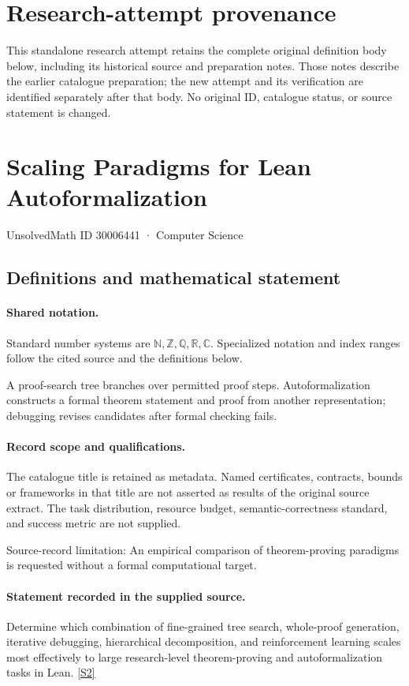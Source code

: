 \documentclass[11pt]{article}
\begin{document}
\section*{Research-attempt provenance}
This standalone research attempt retains the complete original definition body below,
including its historical source and preparation notes. Those notes describe the
earlier catalogue preparation; the new attempt and its verification are identified
separately after that body. No original ID, catalogue status, or source statement is changed.

\section{Scaling Paradigms for Lean Autoformalization}\label{30006441}
{\small UnsolvedMath ID 30006441 · Computer Science}
\subsection{Definitions and mathematical statement}

\paragraph{Shared notation.}Standard number systems are $\mathbb N,\mathbb Z,\mathbb Q,\mathbb R,\mathbb C$. Specialized notation and index ranges follow the cited source and the definitions below.


A proof-search tree branches over permitted proof steps. Autoformalization constructs a formal theorem statement and proof from another representation; debugging revises candidates after formal checking fails.
\paragraph{Record scope and qualifications.}
The catalogue title is retained as metadata. Named certificates, contracts, bounds or frameworks in that title are not asserted as results of the original source extract.
The task distribution, resource budget, semantic-correctness standard, and success metric are not supplied.

Source-record limitation: An empirical comparison of theorem-proving paradigms is requested without a formal computational target.
\paragraph{Statement recorded in the supplied source.}
Determine which combination of fine-grained tree search, whole-proof generation, iterative debugging, hierarchical decomposition, and reinforcement learning scales most effectively to large research-level theorem-proving and autoformalization tasks in Lean. \href{https://doi.org/10.4171/owr/2025/43}{[S2]}
\end{document}
